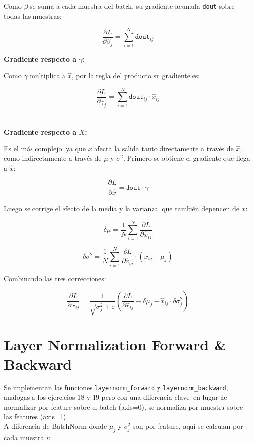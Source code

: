 \documentclass[12pt, letterpaper]{article}
\begin{document}
Como $\beta$ se suma a cada muestra del batch, su gradiente acumula \texttt{dout} sobre todas las muestras:

\[
\frac{\partial L}{\partial \beta_j} = \sum_{i=1}^{N} \texttt{dout}_{ij}
\]

\textbf{Gradiente respecto a $\gamma$:}

Como $\gamma$ multiplica a $\hat{x}$, por la regla del producto su gradiente es:

\[
\frac{\partial L}{\partial \gamma_j} = \sum_{i=1}^{N} \texttt{dout}_{ij} \cdot \hat{x}_{ij}
\] \\ \\ 

\textbf{Gradiente respecto a $X$:}

Es el más complejo, ya que $x$ afecta la salida tanto directamente a través de $\hat{x}$, como indirectamente a través de $\mu$ y $\sigma^2$. Primero se obtiene el gradiente que llega a $\hat{x}$:

\[
\frac{\partial L}{\partial \hat{x}} = \texttt{dout} \cdot \gamma
\] \\ 

Luego se corrige el efecto de la media y la varianza, que también dependen de $x$:

\[
\delta\mu = \frac{1}{N}\sum_{i=1}^{N} \frac{\partial L}{\partial \hat{x}_{ij}}
\] 

\[
\delta\sigma^2 = \frac{1}{N}\sum_{i=1}^{N} \frac{\partial L}{\partial \hat{x}_{ij}} \cdot (x_{ij} - \mu_j)
\]

Combinando las tres correcciones:

\[
\frac{\partial L}{\partial x_{ij}} = \frac{1}{\sqrt{\sigma^2_j + \varepsilon}} \left( \frac{\partial L}{\partial \hat{x}_{ij}} - \delta\mu_j - \hat{x}_{ij} \cdot \delta\sigma^2_j \right)
\]


\newpage

\section{Layer Normalization Forward \& Backward}

Se implementan las funciones \texttt{layernorm\_forward} y \texttt{layernorm\_backward}, análogas a los ejercicios 18 y 19 pero con una diferencia clave: en lugar de normalizar por feature sobre el batch (axis=0), se normaliza por muestra sobre las features (axis=1). \\

A diferencia de BatchNorm donde $\mu_j$ y $\sigma^2_j$ son por feature, aquí se calculan por cada muestra $i$:
\end{document}
